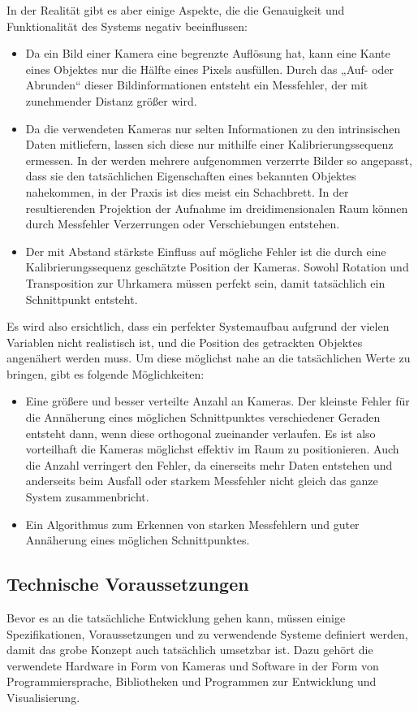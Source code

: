 \documentclass[12pt, ngerman]{article}
\begin{document}
In der Realität gibt es aber einige Aspekte, die die Genauigkeit und Funktionalität des Systems negativ beeinflussen: 
\begin{itemize}
  \item Da ein Bild einer Kamera eine begrenzte Auflösung hat, kann eine Kante eines Objektes nur die Hälfte eines Pixels ausfüllen. Durch das „Auf- oder Abrunden“ dieser Bildinformationen entsteht ein Messfehler, der mit zunehmender Distanz größer wird. 
  \item Da die verwendeten Kameras  nur selten Informationen zu den intrinsischen Daten mitliefern, lassen sich diese nur mithilfe einer Kalibrierungssequenz ermessen. In der werden mehrere aufgenommen verzerrte Bilder so angepasst, dass sie den tatsächlichen Eigenschaften eines bekannten Objektes nahekommen, in der Praxis ist dies meist ein Schachbrett. In der resultierenden Projektion der Aufnahme im dreidimensionalen Raum können durch Messfehler Verzerrungen oder Verschiebungen entstehen. 
  \item Der mit Abstand stärkste Einfluss auf mögliche Fehler ist die durch eine Kalibrierungssequenz geschätzte Position der Kameras. Sowohl Rotation und Transposition zur Uhrkamera müssen perfekt sein, damit tatsächlich ein Schnittpunkt entsteht. 
\end{itemize}

Es wird also ersichtlich, dass ein perfekter Systemaufbau aufgrund der vielen Variablen nicht realistisch ist, und die Position des getrackten Objektes angenähert werden muss. Um diese möglichst nahe an die tatsächlichen Werte zu bringen, gibt es folgende Möglichkeiten: 
\begin{itemize}
  \item Eine größere und besser verteilte Anzahl an Kameras. Der kleinste Fehler für die Annäherung eines möglichen Schnittpunktes verschiedener Geraden entsteht dann, wenn diese orthogonal zueinander verlaufen. Es ist also vorteilhaft die Kameras möglichst effektiv im Raum zu positionieren. Auch die Anzahl verringert den Fehler, da einerseits mehr Daten entstehen und anderseits beim Ausfall oder starkem Messfehler nicht gleich das ganze System zusammenbricht. 
  \item Ein Algorithmus zum Erkennen von starken Messfehlern und guter Annäherung eines möglichen Schnittpunktes. 
\end{itemize}

\newpage
\subsection{Technische Voraussetzungen}
Bevor es an die tatsächliche Entwicklung gehen kann, müssen einige Spezifikationen, Voraussetzungen und zu verwendende Systeme definiert werden, damit das grobe Konzept auch tatsächlich umsetzbar ist. Dazu gehört die verwendete Hardware in Form von Kameras und Software in der Form von Programmiersprache, Bibliotheken und Programmen zur Entwicklung und Visualisierung. 
\end{document}
